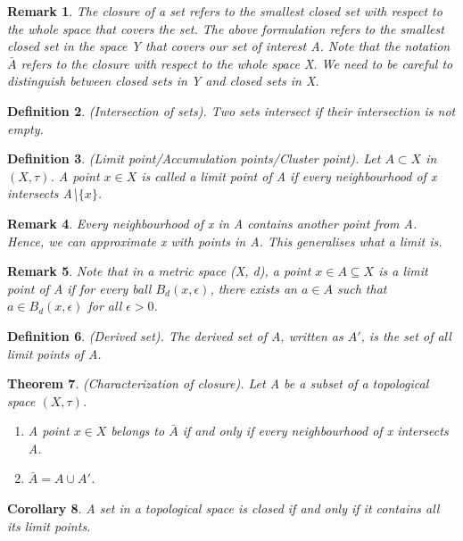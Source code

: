 \documentclass[twoside]{article}
\newcounter{lecnum}
\newtheorem{theorem}{Theorem}[lecnum]
\newtheorem{corollary}[theorem]{Corollary}
\newtheorem{definition}[theorem]{Definition}
\newtheorem{remark}[theorem]{Remark}
\begin{document}
\begin{remark}The closure of a set refers to the smallest closed set with respect to the whole space that covers the set. The above formulation refers to the smallest closed set in the space Y that covers our set of interest A. Note that the notation $\bar{A}$ refers to the closure with respect to the whole space X. We need to be careful to distinguish between closed sets in Y and closed sets in X.
\end{remark}

\begin{definition}(Intersection of sets). Two sets intersect if their intersection is not empty.
\end{definition}

\begin{definition}(Limit point/Accumulation points/Cluster point). Let $A \subset X$ in $(X, \tau)$. A point $x \in X$ is called a limit point of A if every neighbourhood of x intersects A\textbackslash $ \{x\}$.
\end{definition}

\begin{remark}Every neighbourhood of x in A contains another point from A. Hence, we can approximate x with points in A. This generalises what a limit is.
\end{remark}

\begin{remark}Note that in a metric space (X, d), a point $x \in A \subseteq X$ is a limit point of A if for every ball $B_d(x, \epsilon)$, there exists an $a \in A$ such that $a \in B_d(x, \epsilon)$ for all $\epsilon > 0$.
\end{remark}

\begin{definition}(Derived set). The derived set of A, written as $A'$, is the set of all limit points of A.
\end{definition}

\begin{theorem}(Characterization of closure). Let A be a subset of a topological space $(X, \tau)$.
\begin{enumerate}
    \item A point $x \in X$ belongs to $\bar{A}$ if and only if every neighbourhood of x intersects A.
    \item $\bar{A} = A \cup A'$.
\end{enumerate}
\end{theorem}

\begin{corollary}A set in a topological space is closed if and only if it contains all its limit points.
\end{corollary}
\end{document}

